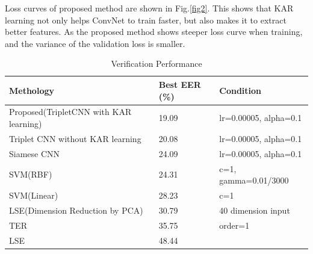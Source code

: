\documentclass[runningheads]{llncs}
\begin{document}
Loss curves of proposed method are shown in Fig.\ref{fig2}.
This shows that KAR learning not only helps ConvNet to train faster, but also makes it to extract better features. As the proposed method shows steeper loss curve when training, and the variance of the validation loss is smaller.

\begin{table}[]
    \caption{Verification Performance}\label{tab3}
    \centering
    \begin{tabular}{|l|l|l|}
    \hline
    Methology   &   Best EER (\%) &   Condition   \\  \hline
    Proposed(TripletCNN with KAR learning) &   19.09   &   lr=0.00005, alpha=0.1  \\
    Triplet CNN without KAR learning    &   20.08   &   lr=0.00005, alpha=0.1  \\
    Siamese CNN  &   24.09   &   lr=0.00005, alpha=0.1  \\
    SVM(RBF)    &   24.31   &   c=1, gamma=0.01/3000 \\
    SVM(Linear) &   28.23   &   c=1 \\
    LSE(Dimension Reduction by PCA)    &   30.79   &  40 dimension input    \\
    TER &   35.75   &   order=1   \\
    LSE &   48.44   &   \\  \hline
    \end{tabular}
\end{table}
\end{document}
